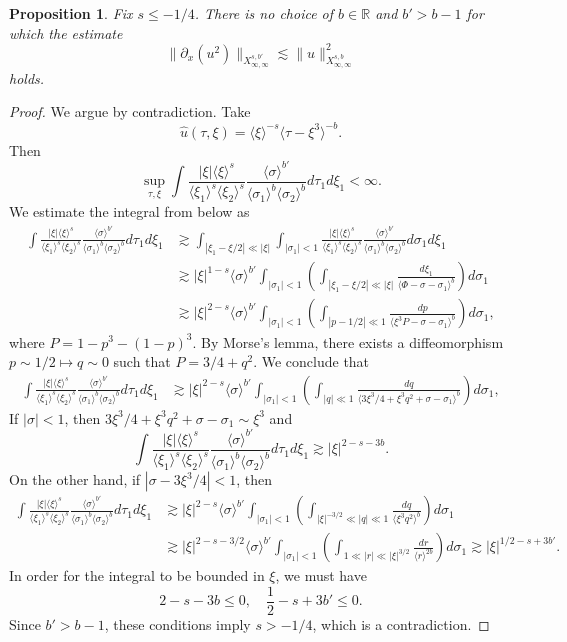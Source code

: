 \documentclass[a4paper, 11pt]{amsart}
\newcommand{\R}{\mathbb{R}}
\newcommand{\jap}[1]{\langle #1 \rangle}
\theoremstyle{plain}
\newtheorem{prop}[thm]{Proposition}
\theoremstyle{definition}
\theoremstyle{remark}
\newcommand{\5}{\text{V}}
\numberwithin{equation}{section}
\theoremstyle{mytheoremstyle} \newtheorem{nota}[thm]{Remark}
\theoremstyle{mytheoremstyle} \newtheorem{exemplo}[thm]{Example}
\begin{document}
\begin{prop}
   Fix $s\le -1/4$. There is no choice of $b\in\R$ and $b'>b-1$ for which the estimate
   $$
   \|\partial_x(u^2)\|_{X^{s,b'}_{\infty,\infty}} \lesssim \|u\|^2_{X^{s,b}_{\infty,\infty}}
   $$
   holds.
\end{prop}
\begin{proof}
We argue by contradiction. Take
$$
\hat{u}(\tau,\xi)=\jap{\xi}^{-s}\jap{\tau-\xi^3}^{-b}.
$$
Then
$$
\sup_{\tau,\xi} \int \frac{|\xi|\jap{\xi}^s}{\jap{\xi_1}^s\jap{\xi_2}^s}\frac{\jap{\sigma}^{b'}}{\jap{\sigma_1}^b\jap{\sigma_2}^b}d\tau_1d\xi_1 <\infty.
$$
We estimate the integral from below as
\begin{align*}
    \int \frac{|\xi|\jap{\xi}^s}{\jap{\xi_1}^s\jap{\xi_2}^s}\frac{\jap{\sigma}^{b'}}{\jap{\sigma_1}^b\jap{\sigma_2}^b}d\tau_1d\xi_1 &\gtrsim \int_{|\xi_1-\xi/2|\ll |\xi|}\int_{|\sigma_1|<1} \frac{|\xi|\jap{\xi}^s}{\jap{\xi_1}^s\jap{\xi_2}^s}\frac{\jap{\sigma}^{b'}}{\jap{\sigma_1}^b\jap{\sigma_2}^b}d\sigma_1d\xi_1\\&\gtrsim |\xi|^{1-s}\jap{\sigma}^{b'}\int_{|\sigma_1|<1} \left(\int_{|\xi_1-\xi/2|\ll |\xi|} \frac{d\xi_1}{\jap{\Phi-\sigma-\sigma_1}^b}\right) d\sigma_1\\&\gtrsim |\xi|^{2-s}\jap{\sigma}^{b'}\int_{|\sigma_1|<1} \left(\int_{|p-1/2|\ll 1} \frac{dp}{\jap{\xi^3P-\sigma-\sigma_1}^b}\right) d\sigma_1,
\end{align*}
where $P=1-p^3-(1-p)^3$. By Morse's lemma, there exists a diffeomorphism $p\sim 1/2\mapsto q\sim 0$ such that $P=3/4+q^2$. We conclude that
\begin{align*}
    \int \frac{|\xi|\jap{\xi}^s}{\jap{\xi_1}^s\jap{\xi_2}^s}\frac{\jap{\sigma}^{b'}}{\jap{\sigma_1}^b\jap{\sigma_2}^b}d\tau_1d\xi_1 &\gtrsim  |\xi|^{2-s}\jap{\sigma}^{b'}\int_{|\sigma_1|<1} \left(\int_{|q|\ll 1} \frac{dq}{\jap{3\xi^3/4 + \xi^3q^2+\sigma-\sigma_1}^b}\right) d\sigma_1,
\end{align*}
If $|\sigma|<1$, then $3\xi^3/4 + \xi^3q^2+\sigma-\sigma_1\sim \xi^3$ and
\begin{equation}
    \int \frac{|\xi|\jap{\xi}^s}{\jap{\xi_1}^s\jap{\xi_2}^s}\frac{\jap{\sigma}^{b'}}{\jap{\sigma_1}^b\jap{\sigma_2}^b}d\tau_1d\xi_1 \gtrsim  |\xi|^{2-s-3b}.
\end{equation}
On the other hand, if $|\sigma-3\xi^3/4|<1$, then
\begin{align*}
    \int \frac{|\xi|\jap{\xi}^s}{\jap{\xi_1}^s\jap{\xi_2}^s}\frac{\jap{\sigma}^{b'}}{\jap{\sigma_1}^b\jap{\sigma_2}^b}d\tau_1d\xi_1 &\gtrsim  |\xi|^{2-s}\jap{\sigma}^{b'}\int_{|\sigma_1|<1} \left(\int_{|\xi|^{-3/2}\ll|q|\ll 1} \frac{dq}{\jap{\xi^3q^2}^b}\right) d\sigma_1\\&\gtrsim |\xi|^{2-s-3/2}\jap{\sigma}^{b'}\int_{|\sigma_1|<1} \left(\int_{1\ll|r|\ll |\xi|^{3/2}} \frac{dr}{\jap{r}^{2b}}\right) d\sigma_1\gtrsim |\xi|^{1/2-s+3b'}.
\end{align*}
In order for the integral to be bounded in $\xi$, we must have
$$
2-s-3b\le 0,\quad \frac{1}{2}-s+3b'\le0.
$$
Since $b'>b-1$, these conditions imply $s> -1/4$, which is a contradiction.
\end{proof}
\end{document}
